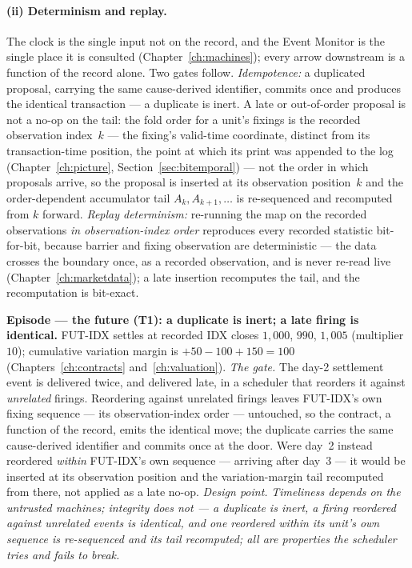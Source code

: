 \paragraph{(ii) Determinism and replay.}
The clock is the single input not on the record, and the Event Monitor is the single place it
is consulted (Chapter~\ref{ch:machines}); every arrow downstream is a function of the record
alone. Two gates follow. \emph{Idempotence:} a duplicated proposal, carrying the same
cause-derived identifier, commits once and produces the identical transaction --- a
duplicate is inert. A late or out-of-order proposal is not a no-op on the tail: the
fold order for a unit's fixings is the recorded observation index~$k$ --- the fixing's
valid-time coordinate, distinct from its transaction-time position, the point at which its
print was appended to the log (Chapter~\ref{ch:picture}, Section~\ref{sec:bitemporal}) ---
not the order in which proposals arrive, so the proposal is inserted at its observation
position~$k$ and the order-dependent accumulator tail $A_{k},A_{k+1},\dots$ is re-sequenced
and recomputed from $k$ forward. \emph{Replay
determinism:} re-running the map on the recorded observations \emph{in observation-index
order} reproduces every recorded statistic bit-for-bit, because barrier and fixing
observation are deterministic --- the data crosses the boundary once, as a recorded
observation, and is never re-read live (Chapter~\ref{ch:marketdata}); a late insertion
recomputes the tail, and the recomputation is bit-exact.

\medskip\noindent\textbf{Episode --- the future (T1): a duplicate is inert; a late firing is
identical.}
FUT-IDX settles at recorded IDX closes $1{,}000$, $990$, $1{,}005$ (multiplier $10$);
cumulative variation margin is $+50-100+150 = 100$ (Chapters~\ref{ch:contracts}
and~\ref{ch:valuation}). \emph{The gate.} The day-2 settlement event is delivered twice, and
delivered late, in a scheduler that reorders it against \emph{unrelated} firings. Reordering
against unrelated firings leaves FUT-IDX's own fixing sequence --- its observation-index
order --- untouched, so the contract, a function of the record, emits the identical
 move; the duplicate carries the same cause-derived identifier and commits once at
the door. Were day~2 instead reordered \emph{within} FUT-IDX's own sequence --- arriving
after day~3 --- it would be inserted at its observation position and the variation-margin
tail recomputed from there, not applied as a late no-op. \emph{Design point.}
\emph{Timeliness depends on the untrusted machines; integrity does not --- a duplicate is
inert, a firing reordered against unrelated events is identical, and one reordered within
its unit's own sequence is re-sequenced and its tail recomputed; all are properties the
scheduler tries and fails to break.}


